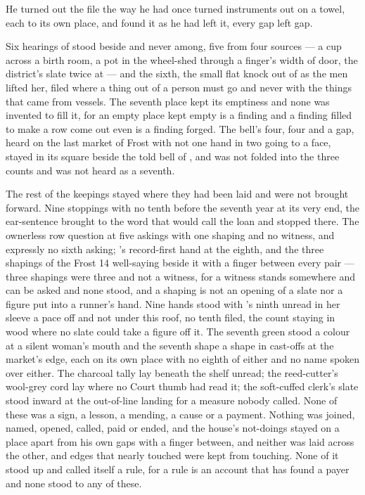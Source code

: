 \scenebreak

He turned out the file the way he had once turned instruments out on a towel, each to its own place, and found it as he had left it, every gap left gap.

Six hearings of  stood beside and never among, five from four sources --- a cup across a birth room, a pot in the wheel-shed through a finger's width of door, the district's slate twice at  --- and the sixth, the small flat knock out of  as the men lifted her, filed where a thing out of a person must go and never with the things that came from vessels. The seventh place kept its emptiness and none was invented to fill it, for an empty place kept empty is a finding and a finding filled to make a row come out even is a finding forged. The bell's four, four and a gap, heard on the last market of Frost with not one hand in two going to a face, stayed in its square beside the told bell of , and was not folded into the three counts and was not heard as a seventh.

The rest of the keepings stayed where they had been laid and were not brought forward. Nine stoppings with no tenth before the seventh year at its very end, the ear-sentence brought to the word that would call the loan and stopped there. The ownerless row question at five askings with one shaping and no witness, and expressly no sixth asking; 's record-first hand at the eighth, and the three shapings of the Frost 14 well-saying beside it with a finger between every pair --- three shapings were three and not a witness, for a witness stands somewhere and can be asked and none stood, and a shaping is not an opening of a slate nor a figure put into a runner's hand. Nine hands stood with 's ninth unread in her sleeve a pace off and not under this roof, no tenth filed, the count staying in wood where no slate could take a figure off it. The seventh green stood a colour at a silent woman's mouth and the seventh shape a shape in cast-offs at the market's edge, each on its own place with no eighth of either and no name spoken over either. The charcoal tally lay beneath the shelf unread; the reed-cutter's wool-grey cord lay where no Court thumb had read it; the soft-cuffed clerk's slate stood inward at the out-of-line landing for a measure nobody called. None of these was a sign, a lesson, a mending, a cause or a payment. Nothing was joined, named, opened, called, paid or ended, and the house's not-doings stayed on a place apart from his own gaps with a finger between, and neither was laid across the other, and edges that nearly touched were kept from touching. None of it stood up and called itself a rule, for a rule is an account that has found a payer and none stood to any of these.

